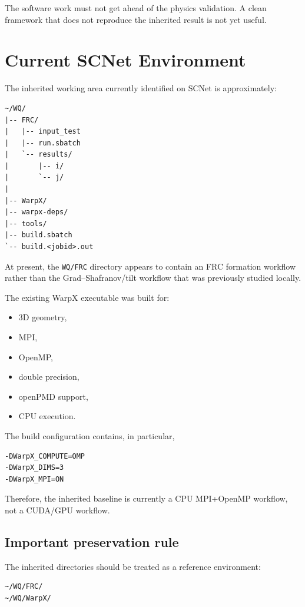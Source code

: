 \documentclass[11pt,a4paper]{article}
\begin{document}
The software work must not get ahead of the physics validation. A clean framework that does not reproduce the inherited result is not yet useful.

\section{Current SCNet Environment}

The inherited working area currently identified on SCNet is approximately:

\begin{lstlisting}
~/WQ/
|-- FRC/
|   |-- input_test
|   |-- run.sbatch
|   `-- results/
|       |-- i/
|       `-- j/
|
|-- WarpX/
|-- warpx-deps/
|-- tools/
|-- build.sbatch
`-- build.<jobid>.out
\end{lstlisting}

At present, the \texttt{WQ/FRC} directory appears to contain an FRC formation workflow rather than the Grad--Shafranov/tilt workflow that was previously studied locally.

The existing WarpX executable was built for:

\begin{itemize}
    \item 3D geometry,
    \item MPI,
    \item OpenMP,
    \item double precision,
    \item openPMD support,
    \item CPU execution.
\end{itemize}

The build configuration contains, in particular,

\begin{lstlisting}
-DWarpX_COMPUTE=OMP
-DWarpX_DIMS=3
-DWarpX_MPI=ON
\end{lstlisting}

Therefore, the inherited baseline is currently a CPU MPI+OpenMP workflow, not a CUDA/GPU workflow.

\subsection{Important preservation rule}

The inherited directories should be treated as a reference environment:

\begin{lstlisting}
~/WQ/FRC/
~/WQ/WarpX/
\end{lstlisting}
\end{document}
